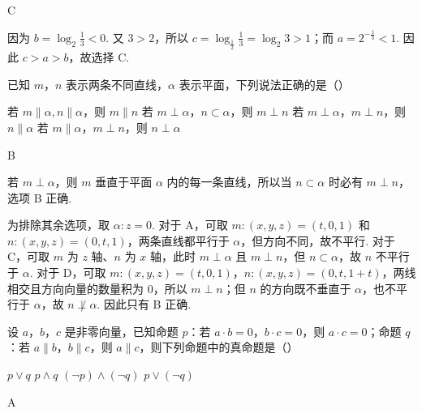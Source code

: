 \begin{answer}
C
\end{answer}

\begin{solution}
因为 \(b=\log_{2}\frac{1}{3}<0\). 又 \(3>2\)，所以
\(c=\log_{\frac{1}{2}}\frac{1}{3}=\log_{2}3>1\)；而
\(a=2^{-\frac{1}{3}}<1\). 因此 \(c>a>b\)，故选择 C.
\end{solution}

\begin{problem}
已知 \(m\)，\(n\) 表示两条不同直线，\(\alpha\) 表示平面，下列说法正确的是（\quad）

\choices
    {若 \(m \parallel \alpha, n \parallel \alpha\)，则 \(m \parallel n\)}
    {若 \(m \perp \alpha\)，\(n \subset \alpha\)，则 \(m \perp n\)}
    {若 \(m \perp \alpha\)，\(m \perp n\)，则 \(n \parallel \alpha\)}
    {若 \(m \parallel \alpha\)，\(m \perp n\)，则 \(n \perp \alpha\)}
\end{problem}

\begin{answer}
B
\end{answer}

\begin{solution}
若 \(m\perp\alpha\)，则 \(m\) 垂直于平面 \(\alpha\) 内的每一条直线，所以当 \(n\subset\alpha\) 时必有 \(m\perp n\)，选项 B 正确.

为排除其余选项，取 \(\alpha:z=0\). 对于 A，可取
\(m:(x,y,z)=(t,0,1)\) 和 \(n:(x,y,z)=(0,t,1)\)，两条直线都平行于 \(\alpha\)，但方向不同，故不平行. 对于 C，可取 \(m\) 为 \(z\) 轴、\(n\) 为 \(x\) 轴，此时 \(m\perp\alpha\) 且 \(m\perp n\)，但 \(n\subset\alpha\)，故 \(n\) 不平行于 \(\alpha\). 对于 D，可取
\(m:(x,y,z)=(t,0,1)\)，\(n:(x,y,z)=(0,t,1+t)\)，两线相交且方向向量的数量积为 \(0\)，所以 \(m\perp n\)；但 \(n\) 的方向既不垂直于 \(\alpha\)，也不平行于 \(\alpha\)，故 \(n\not\perp\alpha\). 因此只有 B 正确.
\end{solution}

\begin{problem}
设 \(a\)，\(b\)，\(c\) 是非零向量，已知命题 \(p\)：若 \(a \cdot b = 0\)，\(b \cdot c = 0\)，则 \(a \cdot c = 0\)；命题 \(q\)：若 \(a \parallel b\)，\(b \parallel c\)，则 \(a \parallel c\)，则下列命题中的真命题是（\quad）

\choices
    {\(p \vee q\)}
    {\(p \wedge q\)}
    {\((\neg p) \wedge (\neg q)\)}
    {\(p \vee (\neg q)\)}
\end{problem}

\begin{answer}
A
\end{answer}

